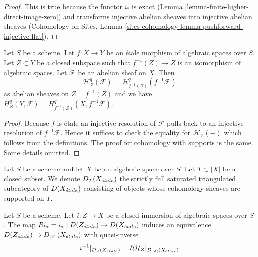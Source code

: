 \begin{proof}
This is true because the functor $i_*$ is exact
(Lemma \ref{lemma-finite-higher-direct-image-zero}) and transforms
injective abelian sheaves into injective abelian sheaves
(Cohomology on Sites, Lemma
\ref{sites-cohomology-lemma-pushforward-injective-flat}).
\end{proof}

\begin{lemma}
\label{lemma-etale-localization-sheaf-with-support}
Let $S$ be a scheme. Let $f : X \to Y$ be an \'etale morphism of
algebraic spaces over $S$. Let $Z \subset Y$ be a closed subspace
such that $f^{-1}(Z) \to Z$ is an isomorphism of algebraic spaces.
Let $\mathcal{F}$ be an abelian sheaf on $X$. Then
$$
\mathcal{H}^q_Z(\mathcal{F}) = \mathcal{H}^q_{f^{-1}(Z)}(f^{-1}\mathcal{F})
$$
as abelian sheaves on $Z = f^{-1}(Z)$ and we
have $H^q_Z(Y, \mathcal{F}) = H^q_{f^{-1}(Z)}(X, f^{-1}\mathcal{F})$.
\end{lemma}

\begin{proof}
Because $f$ is \'etale an injective resolution of $\mathcal{F}$
pulls back to an injective resolution of $f^{-1}\mathcal{F}$.
Hence it suffices to check the equality for $\mathcal{H}_Z(-)$
which follows from the definitions. The proof for cohomology with
supports is the same. Some details omitted.
\end{proof}

\noindent
Let $S$ be a scheme and let $X$ be an algebraic space over $S$.
Let $T \subset |X|$ be a closed subset.
We denote $D_T(X_{\acute{e}tale})$ the
strictly full saturated triangulated subcategory of $D(X_{\acute{e}tale})$
consisting of objects whose cohomology sheaves are supported on $T$.

\begin{lemma}
\label{lemma-complexes-with-support-on-closed}
Let $S$ be a scheme.
Let $i : Z \to X$ be a closed immersion of algebraic spaces over $S$.
The map $Ri_* = i_* : D(Z_{\acute{e}tale}) \to D(X_{\acute{e}tale})$
induces an equivalence $D(Z_{\acute{e}tale}) \to D_{|Z|}(X_{\acute{e}tale})$ with quasi-inverse
$$
i^{-1}|_{D_Z(X_{\acute{e}tale})} = R\mathcal{H}_Z|_{D_{|Z|}(X_{\acute{e}tale})}
$$
\end{lemma}


